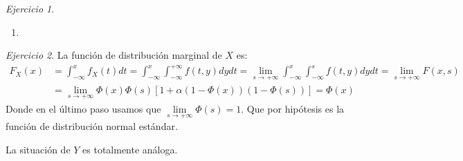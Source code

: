 \documentclass[12pt,spanish]{article}
\theoremstyle{definition}
\theoremstyle{remark}
\newtheorem{exercise}{Ejercicio}
\begin{document}
\begin{exercise}
  \begin{enumerate}
  \item 
  \end{enumerate}
\end{exercise}

\begin{exercise}
  La función de distribución marginal de $X$ es:
  \begin{align*}
    F_X(x)&=\int_{-\infty}^xf_X(t)dt=\int_{-\infty}^x\int_{-\infty}^{+\infty}f(t,y)dydt=\lim_{s\to+\infty}\int_{-\infty}^x\int_{-\infty}^sf(t,y)dydt=\lim_{s\to+\infty}F(x,s) \\
          &=\lim_{s\to+\infty}\Phi(x)\Phi(s)[1+\alpha(1-\Phi(x))(1-\Phi(s))] = \Phi(x)
  \end{align*}
  Donde en el último paso usamos que
  $\lim\limits_{s\to+\infty}\Phi(s)=1$.
  Que por hipótesis es la función de distribución normal estándar.

  La situación de $Y$ es totalmente análoga.
\end{exercise}
\end{document}
